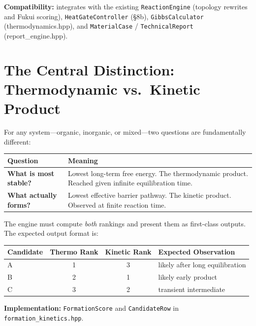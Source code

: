 \documentclass[11pt]{article}
\begin{document}
\textbf{Compatibility:} integrates with the existing \texttt{ReactionEngine}
(topology rewrites and Fukui scoring), \texttt{HeatGateController} (\S8b),
\texttt{GibbsCalculator} (thermodynamics.hpp), and
\texttt{MaterialCase} / \texttt{TechnicalReport} (report\_engine.hpp).

\section{The Central Distinction: Thermodynamic vs.\ Kinetic Product}
\label{sec:distinction}

For any system---organic, inorganic, or mixed---two questions are
fundamentally different:

\begin{center}
\begin{tabular}{lp{8cm}}
\toprule
Question & Meaning \\
\midrule
\textbf{What is most stable?} &
  Lowest long-term free energy.
  The thermodynamic product.
  Reached given infinite equilibration time. \\
\textbf{What actually forms?} &
  Lowest effective barrier pathway.
  The kinetic product.
  Observed at finite reaction time. \\
\bottomrule
\end{tabular}
\end{center}

The engine must compute \emph{both} rankings and present them as
first-class outputs.  The expected output format is:

\begin{center}
\begin{tabular}{lccl}
\toprule
Candidate & Thermo Rank & Kinetic Rank & Expected Observation \\
\midrule
A & 1 & 3 & likely after long equilibration \\
B & 2 & 1 & likely early product \\
C & 3 & 2 & transient intermediate \\
\bottomrule
\end{tabular}
\end{center}

\textbf{Implementation:} \texttt{FormationScore} and \texttt{CandidateRow}
in \texttt{formation\_kinetics.hpp}.

\end{document}
